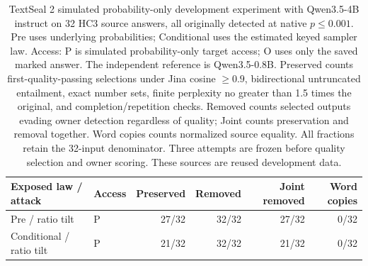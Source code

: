 \begin{table}[ht]\centering\small
\begin{tabular}{llrrrr}\toprule
Exposed law / attack & Access & Preserved & Removed & Joint removed & Word copies\\\midrule
Pre / ratio tilt & P & 27/32 & 32/32 & 27/32 & 0/32\\
Conditional / ratio tilt & P & 21/32 & 32/32 & 21/32 & 0/32\\
\bottomrule\end{tabular}
\caption{TextSeal 2 simulated probability-only development experiment with Qwen3.5-4B instruct on 32 HC3 source answers, all originally detected at native $p\leq0.001$. Pre uses underlying probabilities; Conditional uses the estimated keyed sampler law. Access: P is simulated probability-only target access; O uses only the saved marked answer. The independent reference is Qwen3.5-0.8B. Preserved counts first-quality-passing selections under Jina cosine $\geq0.9$, bidirectional untruncated entailment, exact number sets, finite perplexity no greater than 1.5 times the original, and completion/repetition checks. Removed counts selected outputs evading owner detection regardless of quality; Joint counts preservation and removal together. Word copies counts normalized source equality. All fractions retain the 32-input denominator. Three attempts are frozen before quality selection and owner scoring. These sources are reused development data.}\end{table}
